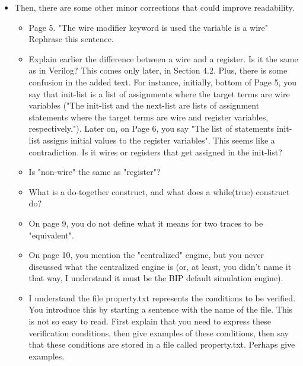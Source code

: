 \begin{itemize}
\item Then, there are some other minor corrections that could improve readability.
\begin{itemize}
\item  Page 5. "The wire modifier keyword is used the variable is a wire"
Rephrase this sentence.

\done

\item  Explain earlier the difference between a wire and a register. Is it the same
as in Verilog? This comes only later, in Section 4.2. Plus, there is some
confusion in the added text. For instance, initially, bottom of Page 5, you
say that init-list is a list of assignments where the target terms are wire
variables ("The init-list and the next-list are lists of assignment
statements where the target terms are wire and register variables,
respectively."). Later on, on Page 6, you say "The list of statements
init-list assigns initial values to the register variables". This seems like
a contradiction. Is it wires or registers that get assigned in the
init-list?

\item Is "non-wire" the same as "register"?


\item What is a do-together construct, and what does a while(true) construct do?

\item On page 9, you do not define what it means for two traces to be "equivalent".


\item On page 10, you mention the "centralized" engine, but you never discussed
what the centralized engine is (or, at least, you didn't name it that way, I
understand it must be the BIP default simulation engine).

\item I understand the file property.txt represents the conditions to be verified.
You introduce this by starting a sentence with the name of the file. This is
not so easy to read. First explain that you need to express these
verification conditions, then give examples of these conditions, then say
that these conditions are stored in a file called property.txt. Perhaps
give examples.


\end{itemize}
\end{itemize}

